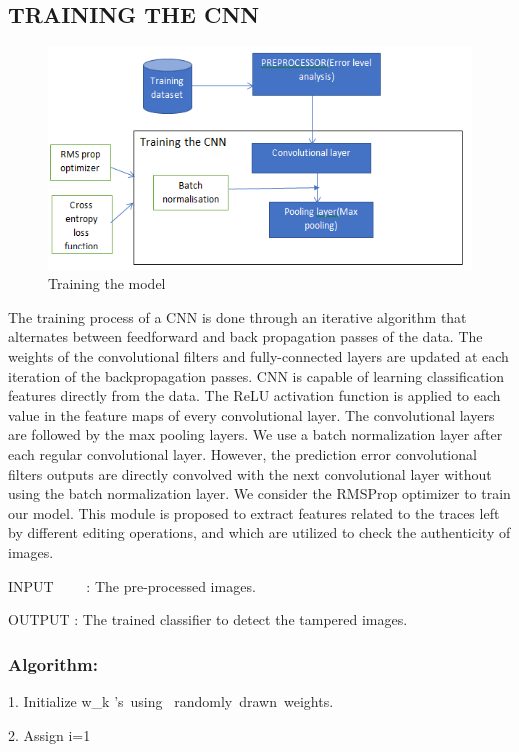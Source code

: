 \subsection{TRAINING THE CNN}
\begin{figure}[htp]
\centering
\includegraphics[scale=0.5,width=17cm]{Figures/cnn.PNG}
\caption{Training the model}
\label{fig:universe}
\end{figure}
The training process of a CNN is done through an iterative algorithm that alternates between feedforward  and back propagation passes of the data. The weights of the convolutional filters and fully-connected layers are updated at each iteration of the backpropagation passes. CNN is capable of learning classification features directly from the data. The ReLU activation function is applied to each value in the feature maps of every convolutional layer. The convolutional layers are followed by the max pooling layers. We use a batch normalization layer after each regular convolutional layer. However, the prediction error convolutional filters outputs are directly convolved with the next convolutional layer without using the batch normalization layer. We consider the RMSProp optimizer  to train our model. This module is proposed to extract features related to the traces left by different editing operations, and which are utilized to check the authenticity of images. 

INPUT \ \ \ \ : The pre-processed images.

OUTPUT : The trained classifier to detect the tampered images.

\subsubsection{Algorithm:}
1. Initialize w_k 's\  using \ randomly\  drawn\  weights.
    
2. Assign i=1


